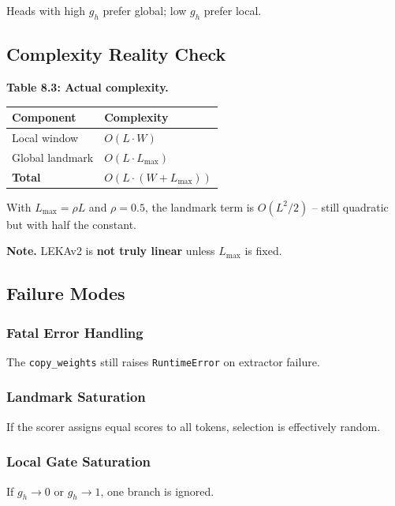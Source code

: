 Heads with high $g_h$ prefer global; low $g_h$ prefer local.

\subsection{Complexity Reality Check}

\textbf{Table 8.3: Actual complexity.}

\begin{table}[H]
\centering
\small
\begin{tabular}{ll}
\toprule
\textbf{Component} & \textbf{Complexity} \\
\midrule
Local window & $O(L \cdot W)$ \\
Global landmark & $O(L \cdot L_\text{max})$ \\
\textbf{Total} & \textbf{$O(L \cdot (W + L_\text{max}))$} \\
\bottomrule
\end{tabular}
\end{table}

With $L_\text{max} = \rho L$ and $\rho = 0.5$, the landmark term is 
$O(L^2 / 2)$ -- still quadratic but with half the constant.

\textbf{Note.} LEKAv2 is \textbf{not truly linear} unless $L_\text{max}$ is fixed.

\subsection{Failure Modes}

\subsubsection{Fatal Error Handling}

The \texttt{copy\_weights} still raises \texttt{RuntimeError} on extractor failure.

\subsubsection{Landmark Saturation}

If the scorer assigns equal scores to all tokens, selection is effectively 
random.

\subsubsection{Local Gate Saturation}

If $g_h \to 0$ or $g_h \to 1$, one branch is ignored.

